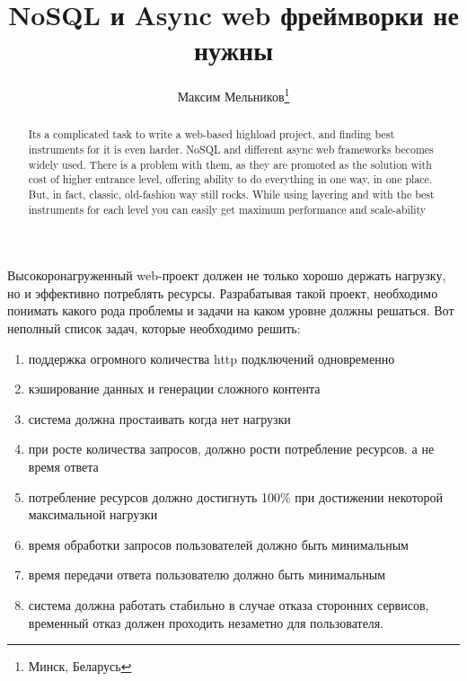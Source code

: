 \documentclass[10pt, a5paper]{article}
\begin{document}
\title{NoSQL и Async web фреймворки не нужны}%

\author{Максим Мельников\footnote{Минск, Беларусь}}
\maketitle

\begin{abstract}
Its a complicated task to write a web-based highload project, and finding best instruments for it is even harder. NoSQL and different async web frameworks becomes widely used. There is a problem with them, as they are promoted as the solution with cost of higher entrance level, offering ability to do everything in one way, in one place. But, in fact, classic, old-fashion way still rocks. While using layering and with the best instruments for each level you can easily get maximum performance and scale-ability
\end{abstract}

Высокоронагруженный web-проект должен не только хорошо держать нагрузку, но и эффективно потреблять ресурсы. Разрабатывая такой проект, необходимо понимать какого рода проблемы и задачи на каком уровне должны решаться. Вот неполный список задач, которые необходимо решить:

\begin{enumerate}
  \item поддержка огромного количества http подключений одновременно
  \item кэширование данных и генерации сложного контента
  \item система должна простаивать когда нет нагрузки
  \item при росте количества запросов, должно рости потребление ресурсов. а не время ответа
  \item потребление ресурсов должно достигнуть 100\% при достижении некоторой максимальной нагрузки
  \item время обработки запросов пользователей должно быть минимальным
  \item время передачи ответа пользователю должно быть минимальным
  \item система должна работать стабильно в случае отказа сторонних сервисов,  временный отказ должен проходить незаметно для пользователя.
\end{enumerate}
\end{document}
